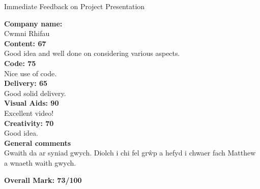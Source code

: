 \documentclass{article}
\begin{document}
\begin{center}
\Huge{Immediate Feedback on Project Presentation}\\
\end{center}


\normalsize
\textbf{Company name:}\\

Cwmni Rhifau \\

\textbf{Content: 67}\\

Good idea and well done on considering various aspects.\\

\textbf{Code: 75}\\

Nice use of code.\\

\textbf{Delivery: 65}\\

Good solid delivery.\\

\textbf{Visual Aids: 90}\\

Excellent video!\\

\textbf{Creativity: 70}\\

Good idea.\\

\textbf{General comments}\\

Gwaith da ar syniad gwych. Diolch i chi fel gr\^wp a hefyd i chwaer fach Matthew a wnaeth waith gwych.

\textbf{Overall Mark: 73/100}
\end{document}
